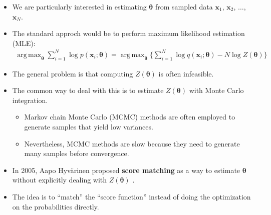 \documentclass[10pt]{article}
\newcommand{\ve}[1]{\mathbf{#1}}
\newcommand{\ves}[1]{\boldsymbol{#1}}
\DeclareMathOperator*{\argmax}{arg\,max}
\begin{document}
\begin{itemize}
  \item We are particularly interested in estimating $\ves{\theta}$ from sampled data $\ve{x}_1$, $\ve{x}_2$, $\dotsc$, $\ve{x}_N$.
  
  \item The standard approch would be to perform maximum likelihood estimation (MLE):
  \begin{align*}
      \argmax_{\boldsymbol{\theta}} \sum_{i=1}^N \log p(\ve{x}_i;\boldsymbol{\theta}) = \argmax_{\boldsymbol{\theta}} \bigg\{ \sum_{i=1}^N \log q(\ve{x}_i;\boldsymbol{\theta}) -N \log Z(\boldsymbol{\theta}) \bigg\}
  \end{align*}

  \item The general problem is that computing $Z(\boldsymbol{\theta})$ is often infeasible.
  
  \item The common way to deal with this is to estimate $Z(\boldsymbol{\theta})$ with Monte Carlo integration.
  \begin{itemize}
    \item Markov chain Monte Carlo (MCMC) methods are often employed to generate samples that yield low variances.
    \item Nevertheless, MCMC methods are slow because they need to generate many samples before convergence.
  \end{itemize}
  
  \item In 2005, Aapo Hyv\"{a}rinen proposed {\bf score matching} as a way to estimate $\boldsymbol{\theta}$ without explicitly dealing with $Z(\boldsymbol{\theta})$ \cite{Hyvarinen:2005}.
  
  \item The idea is to ``match'' the ``score function'' instead of doing the optimization on the probabilities directly.
  

\end{itemize}
\end{document}
